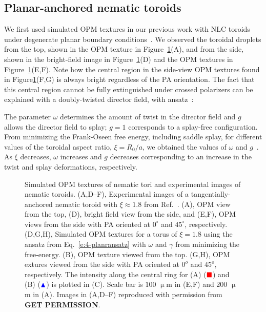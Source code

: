 \subsection{Planar-anchored nematic toroids}
We first used simulated OPM textures in our previous work with NLC toroids under degenerate planar boundary conditions~\cite{RN46}.
We observed the toroidal droplets from the top, shown in the OPM texture in Figure~\ref{f:4-PlanarTorusComparison}(A), and from the side, shown in the bright-field image in Figure~\ref{f:4-PlanarTorusComparison}(D) and the OPM textures in Figure~\ref{f:4-PlanarTorusComparison}(E,F).
Note how the central region in the side-view OPM textures found in Figure\ref{f:4-PlanarTorusComparison}(F,G) is always bright regardless of the PA orientation.
The fact that this central region cannot be fully extinguished under crossed polarizers can be explained with a doubly-twisted director field, with ansatz~\cite{RN46}:


The parameter $\omega$ determines the amount of twist in the director field and $g$ allows the director field to splay; $g=1$ corresponds to a splay-free configuration.
From minimizing the Frank-Oseen free energy, including saddle splay, for different values of the toroidal aspect ratio, $\xi = R_0/a$, we obtained the values of $\omega$ and $g$~\cite{RN46}.
As $\xi$ decreases, $\omega$ increases and $g$ decreases corresponding to an increase in the twist and splay deformations, respectively.
\begin{figure}
\centering
\caption{Simulated OPM textures of nematic tori and experimental images of nematic toroids. (A,D--F), Experimental images of a tangentially-anchored nematic toroid with $\xi \approx 1.8$ from Ref.~\cite{RN46}.
(A), OPM view from the top, (D), bright field view from the side, and (E,F), OPM views from the side with PA oriented at $0^{\circ}$ and $45^{\circ}$, respectively.
(D,G,H), Simulated OPM textures for a torus of $\xi = 1.8$ using the ansatz from Eq.~\ref{e:4-planransatz} with $\omega$ and $\gamma$ from minimizing the free-energy.
(B), OPM texture viewed from the top.
(G,H), OPM extures viewed from the side with PA oriented at $0^o$ and $45^o$, respectively.
The intensity along the central ring for (A) ($\color{red}\blacksquare$) and (B) ($\color{blue}\blacktriangle$) is plotted in (C).
Scale bar is $100$ $\upmu$m in (E,F) and $200$ $\upmu$m in (A).
Images in (A,D--F) reproduced with permission from {\bf GET PERMISSION}.}\label{f:4-PlanarTorusComparison}
\end{figure}

